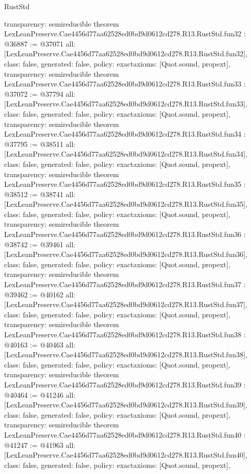\begin{lexlean}{RustStd}
\begin{coremodule}
{  transparency: semireducible
}
theorem LexLeanPreserve.Cae4456d77aa62528ed0bd9d0612cd278.R13.RustStd.fun32 : @36887 := @37071 {
  all: [LexLeanPreserve.Cae4456d77aa62528ed0bd9d0612cd278.R13.RustStd.fun32],
  class: false,
  generated: false,
  policy: exact{axioms: [Quot.sound, propext]},
  transparency: semireducible
}
theorem LexLeanPreserve.Cae4456d77aa62528ed0bd9d0612cd278.R13.RustStd.fun33 : @37072 := @37794 {
  all: [LexLeanPreserve.Cae4456d77aa62528ed0bd9d0612cd278.R13.RustStd.fun33],
  class: false,
  generated: false,
  policy: exact{axioms: [Quot.sound, propext]},
  transparency: semireducible
}
theorem LexLeanPreserve.Cae4456d77aa62528ed0bd9d0612cd278.R13.RustStd.fun34 : @37795 := @38511 {
  all: [LexLeanPreserve.Cae4456d77aa62528ed0bd9d0612cd278.R13.RustStd.fun34],
  class: false,
  generated: false,
  policy: exact{axioms: [Quot.sound, propext]},
  transparency: semireducible
}
theorem LexLeanPreserve.Cae4456d77aa62528ed0bd9d0612cd278.R13.RustStd.fun35 : @38512 := @38741 {
  all: [LexLeanPreserve.Cae4456d77aa62528ed0bd9d0612cd278.R13.RustStd.fun35],
  class: false,
  generated: false,
  policy: exact{axioms: [Quot.sound, propext]},
  transparency: semireducible
}
theorem LexLeanPreserve.Cae4456d77aa62528ed0bd9d0612cd278.R13.RustStd.fun36 : @38742 := @39461 {
  all: [LexLeanPreserve.Cae4456d77aa62528ed0bd9d0612cd278.R13.RustStd.fun36],
  class: false,
  generated: false,
  policy: exact{axioms: [Quot.sound, propext]},
  transparency: semireducible
}
theorem LexLeanPreserve.Cae4456d77aa62528ed0bd9d0612cd278.R13.RustStd.fun37 : @39462 := @40162 {
  all: [LexLeanPreserve.Cae4456d77aa62528ed0bd9d0612cd278.R13.RustStd.fun37],
  class: false,
  generated: false,
  policy: exact{axioms: [Quot.sound, propext]},
  transparency: semireducible
}
theorem LexLeanPreserve.Cae4456d77aa62528ed0bd9d0612cd278.R13.RustStd.fun38 : @40163 := @40463 {
  all: [LexLeanPreserve.Cae4456d77aa62528ed0bd9d0612cd278.R13.RustStd.fun38],
  class: false,
  generated: false,
  policy: exact{axioms: [Quot.sound, propext]},
  transparency: semireducible
}
theorem LexLeanPreserve.Cae4456d77aa62528ed0bd9d0612cd278.R13.RustStd.fun39 : @40464 := @41246 {
  all: [LexLeanPreserve.Cae4456d77aa62528ed0bd9d0612cd278.R13.RustStd.fun39],
  class: false,
  generated: false,
  policy: exact{axioms: [Quot.sound, propext]},
  transparency: semireducible
}
theorem LexLeanPreserve.Cae4456d77aa62528ed0bd9d0612cd278.R13.RustStd.fun40 : @41247 := @41963 {
  all: [LexLeanPreserve.Cae4456d77aa62528ed0bd9d0612cd278.R13.RustStd.fun40],
  class: false,
  generated: false,
  policy: exact{axioms: [Quot.sound, propext]},
}
\end{coremodule}
\end{lexlean}
